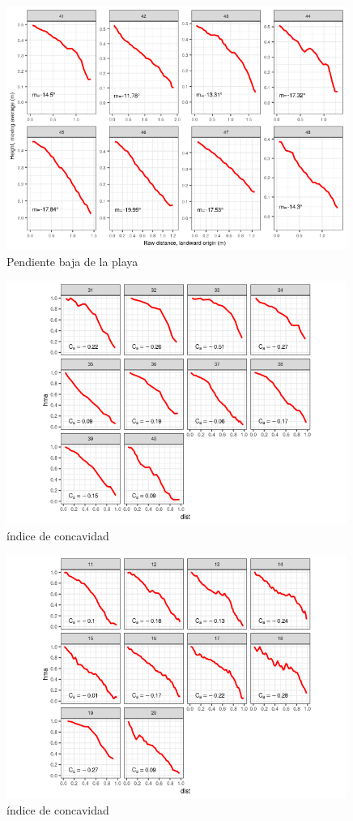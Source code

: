 \documentclass[11pt,]{article}
\begin{document}
\begin{figure}
\centering
\includegraphics[height=3.12500in]{pendiente_2.png}
\caption{Pendiente baja de la playa\label{baja}}
\end{figure}

\begin{figure}
\centering
\includegraphics[height=3.12500in]{indice_concavidad.png}
\caption{índice de concavidad\label{indice}}
\end{figure}

\begin{figure}
\centering
\includegraphics[height=3.12500in]{concavo.png}
\caption{índice de concavidad\label{concavo}}
\end{figure}
\end{document}
